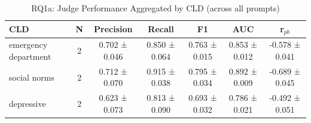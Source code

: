 \begin{table}[htbp]
\centering
\caption{RQ1a: Judge Performance Aggregated by CLD (across all prompts)}
\label{tab:rq1a_by_cld}
\begin{tabular}{lcccccc}
\toprule
\textbf{CLD} & \textbf{N} & \textbf{Precision} & \textbf{Recall} & \textbf{F1} & \textbf{AUC} & \textbf{r$_{pb}$} \\
\midrule
emergency department & 2 & 0.702 ± 0.046 & 0.850 ± 0.064 & 0.763 ± 0.015 & 0.853 ± 0.012 & -0.578 ± 0.041 \\
social norms & 2 & 0.712 ± 0.070 & 0.915 ± 0.038 & 0.795 ± 0.034 & 0.892 ± 0.009 & -0.689 ± 0.045 \\
depressive & 2 & 0.623 ± 0.073 & 0.813 ± 0.090 & 0.693 ± 0.032 & 0.786 ± 0.021 & -0.492 ± 0.051 \\
\bottomrule
\end{tabular}
\end{table}